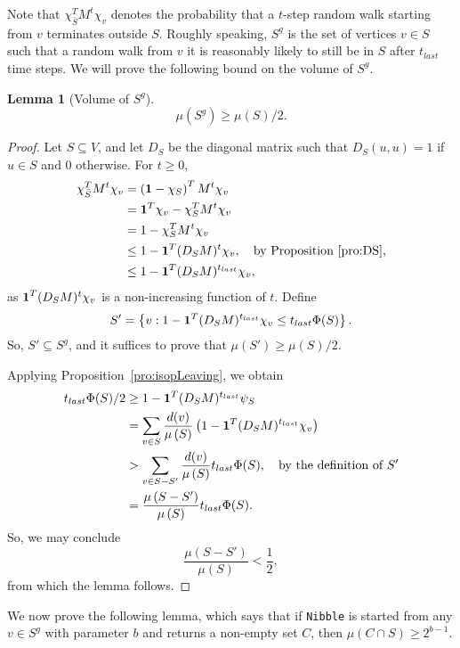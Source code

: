 \documentclass[11pt]{article}
\newtheorem{lemma}[theorem]{Lemma}
\def\form#1#2{#1^{T} #2}
\def\setof#1{\left\{#1  \right\}}
\def\bvec#1{{\mbox{\boldmath $#1$}}}
\def\setof#1{\left\{#1  \right\}}
\def\vol#1{\mu \left(#1  \right)}
\begin{document}
Note that $\form{\chi _{\bar{S}}}{M^{t} \chi _{v}}$
  denotes the probability that a $t$-step random walk
  starting from $v$ terminates outside $S$.
Roughly speaking, $S^{g}$ is the set of vertices $v \in S$
  such that a random walk from $v$
  it is reasonably likely to still be in $S$ after $t_{last}$
  time steps.
We will prove the following bound on the volume of $S^{g}$.
\begin{lemma}[Volume of $S^{g}$]\label{lem:sizeSg}
\[
  \vol{S^{g}} \geq \vol{S}/2.
\]
\end{lemma}
\begin{proof}
Let $S \subseteq V$, and let $D_{S}$ be the diagonal matrix such that
  $D_{S} (u,u) = 1$ if $u \in S$ and $0$ otherwise.
For $t \geq 0$,
\begin{align*}
\form{\chi _{\bar{S}}}{M^{t} \chi _{v}}
& =
\left(\bvec{1} - \chi_{S} \right)^{T} M^{t} \chi_{v}\\
& =
\bvec{1}^{T}  \chi_{v} - \chi_{S}^{T} M^{t}  \chi_{v}\\
& =
1 - \form{\chi _{S}}{M^{t} \chi _{v}}\\
& \leq
1 - \form{\bvec{1}}{(D_{S} M)^{t} \chi _{v}},
\quad \text{by Proposition~\ref{pro:DS},}
\\
& \leq
1 - \form{\bvec{1}}{(D_{S} M)^{t_{last}} \chi _{v}},
\end{align*}
as $\form{\bvec{1}}{(D_{S} M)^{t} \chi _{v}}$
  is a non-increasing function of $t$.
Define
\[
 S' = \setof{v : 1 - \form{\bvec{1}}{(D_{S} M)^{t_{last}} \chi _{v}}
  \leq
   t_{last} \Phi (S)}.
\]
So, $S' \subseteq S^{g}$, and it
  suffices to prove that
  $\vol{S'} \geq \vol{S}/ 2$.

Applying Proposition~\ref{pro:isopLeaving}, we obtain
\begin{align*}
t_{last} \Phi (S) / 2
& \geq
 1 - \form{\bvec{1}}{(D_{S} M)^{t_{last}} \psi _{S}}
\\
 & =
  \sum _{v \in S}
  \frac{d (v)}{\vol{S}}
\left( 1 - \form{\bvec{1}}{(D_{S} M)^{t_{last}} \chi _{v}} \right)
\\
 & >
  \sum _{v \in S - S'}
  \frac{d (v)}{\vol{S}}
   t_{last} \Phi (S), \quad \text{by the definition of $S'$}\\
 & = \frac{\vol{S - S'}}{\vol{S}}
   t_{last} \Phi (S).
\end{align*}
So, we may conclude
\[
\frac{\vol{S - S'}}{\vol{S}}
<
\frac{1}{2},
\]
from which the lemma follows.
\end{proof}


We now prove the following lemma,  which says  that
  if \texttt{Nibble} is started from any
  $v \in S^{g}$ with parameter $b$ and returns a non-empty set $C$,
  then  $\vol{C \cap S} \geq 2^{b-1}$.
\end{document}
